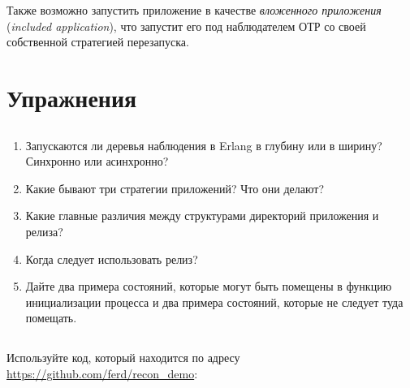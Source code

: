 Также возможно запустить приложение в качестве \emph{вложенного приложения} (\emph{included application}), что запустит его под наблюдателем ОТР со своей собственной стратегией перезапуска.


\section{Упражнения}

\subsection*{\ReviewTitle}

\begin{enumerate}
	\item Запускаются ли деревья наблюдения в Erlang в глубину или в ширину? Синхронно или асинхронно?
	\item Какие бывают три стратегии приложений? Что они делают?
	\item Какие главные различия между структурами директорий приложения и релиза?
	\item Когда следует использовать релиз?
	\item Дайте два примера состояний, которые могут быть помещены в функцию инициализации процесса и два примера состояний, которые не следует туда помещать.
\end{enumerate}

\subsection*{\HandsOnTitle{}}

Используйте код, который находится по адресу
\href{https://github.com/ferd/recon\_demo}{https://github.com/ferd/recon\_demo}:

